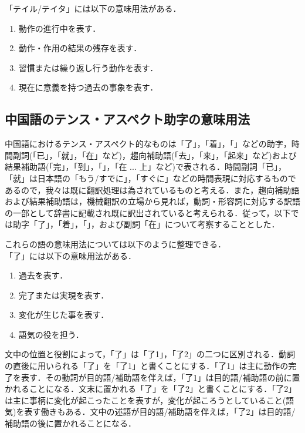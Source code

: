 「テイル/テイタ」には以下の意味用法がある．
\begin{enumerate}
\item 動作の進行中を表す．
\item 動作・作用の結果の残存を表す．
\item 習慣または繰り返し行う動作を表す．
\item 現在に意義を持つ過去の事象を表す．
\end{enumerate}


\subsection{中国語のテンス・アスペクト助字の意味用法}

中国語におけるテンス・アスペクト的なものは「了」，「着」，「」などの助字，時間副詞(「已」，「就」，「在」など)，趨向補助語(「去」，「来」，「起来」など)および結果補助語(「完」，「到」，「」，「在 ... 上」など)で表される．時間副詞「已」，「就」は日本語の「もう/すでに」，「すぐに」などの時間表現に対応するものであるので，我々は既に翻訳処理は為されているものと考える．また，趨向補助語および結果補助語は，機械翻訳の立場から見れば，動詞・形容詞に対応する訳語の一部として辞書に記載され既に訳出されていると考えられる．従って，以下では助字「了」，「着」，「」，および副詞「在」について考察することとした．

これらの語の意味用法については以下のように整理できる\cite{Ryu1996,Kanemizu2000,Shu1989,Ro1980,Cho1985}．\\

「了」には以下の意味用法がある．
\begin{enumerate}
\item 過去を表す．
\item 完了または実現を表す．
\item 変化が生じた事を表す．
\item 語気の役を担う．\\
\end{enumerate}

文中の位置と役割によって，「了」は「了1」，「了2」の二つに区別される．動詞の直後に用いられる「了」を「了1」と書くことにする．「了1」は主に動作の完了を表す．その動詞が目的語/補助語を伴えば，「了1」は目的語/補助語の前に置かれることになる．文末に置かれる「了」を「了2」と書くことにする．「了2」は主に事柄に変化が起こったことを表すが，変化が起ころうとしていること(語気)を表す働きもある．文中の述語が目的語/補助語を伴えば，「了2」は目的語/補助語の後に置かれることになる．

